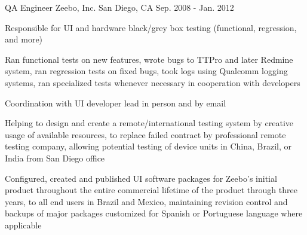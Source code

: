 \begin{cventries}
    \cventry
    {QA Engineer} %
    {Zeebo, Inc.} %
    {San Diego, CA} %
    {Sep. 2008 - Jan. 2012} %
    {
      \begin{cvitems} %
        \item[] {Responsible for UI and hardware black/grey box testing (functional, regression, and more)}
        \item[]
        \item {Ran functional tests on new features, wrote bugs to TTPro and later Redmine system, ran regression tests on fixed bugs, took logs using Qualcomm logging systems, ran specialized tests whenever necessary in cooperation with developers}
        \item {Coordination with UI developer lead in person and by email}
        \item {Helping to design and create a remote/international testing system by creative usage of available resources, to replace failed contract by professional remote testing company, allowing potential testing of device units in China, Brazil, or India from San Diego office}
        \item {Configured, created and published UI software packages for Zeebo's initial product throughout the entire commercial lifetime of the product through three years, to all end users in Brazil and Mexico, maintaining revision control and backups of major packages customized for Spanish or Portuguese language where applicable}
      \end{cvitems}
    }
\end{cventries}
